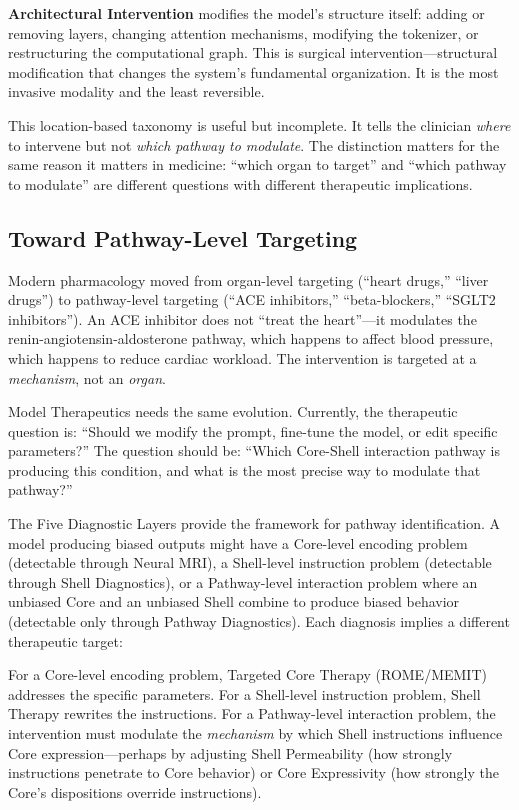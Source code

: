 \documentclass[11pt]{article}
\begin{document}
\textbf{Architectural Intervention} modifies the model's structure itself: adding or removing layers, changing attention mechanisms, modifying the tokenizer, or restructuring the computational graph. This is surgical intervention---structural modification that changes the system's fundamental organization. It is the most invasive modality and the least reversible.

This location-based taxonomy is useful but incomplete. It tells the clinician \emph{where} to intervene but not \emph{which pathway to modulate}. The distinction matters for the same reason it matters in medicine: ``which organ to target'' and ``which pathway to modulate'' are different questions with different therapeutic implications.

\subsection{Toward Pathway-Level Targeting}

Modern pharmacology moved from organ-level targeting (``heart drugs,'' ``liver drugs'') to pathway-level targeting (``ACE inhibitors,'' ``beta-blockers,'' ``SGLT2 inhibitors''). An ACE inhibitor does not ``treat the heart''---it modulates the renin-angiotensin-aldosterone pathway, which happens to affect blood pressure, which happens to reduce cardiac workload. The intervention is targeted at a \emph{mechanism}, not an \emph{organ}.

Model Therapeutics needs the same evolution. Currently, the therapeutic question is: ``Should we modify the prompt, fine-tune the model, or edit specific parameters?'' The question should be: ``Which Core-Shell interaction pathway is producing this condition, and what is the most precise way to modulate that pathway?''

The Five Diagnostic Layers provide the framework for pathway identification. A model producing biased outputs might have a Core-level encoding problem (detectable through Neural MRI), a Shell-level instruction problem (detectable through Shell Diagnostics), or a Pathway-level interaction problem where an unbiased Core and an unbiased Shell combine to produce biased behavior (detectable only through Pathway Diagnostics). Each diagnosis implies a different therapeutic target:

For a Core-level encoding problem, Targeted Core Therapy (ROME/MEMIT) addresses the specific parameters. For a Shell-level instruction problem, Shell Therapy rewrites the instructions. For a Pathway-level interaction problem, the intervention must modulate the \emph{mechanism} by which Shell instructions influence Core expression---perhaps by adjusting Shell Permeability (how strongly instructions penetrate to Core behavior) or Core Expressivity (how strongly the Core's dispositions override instructions).
\end{document}

